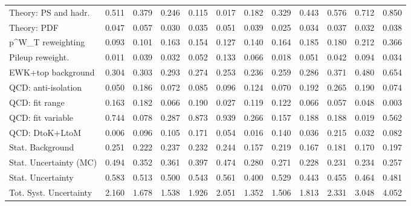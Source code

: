 \begin{tabular}{l|p{0.6cm}p{0.6cm}p{0.6cm}p{0.6cm}p{0.6cm}p{0.6cm}p{0.6cm}p{0.6cm}p{0.6cm}p{0.6cm}p{0.6cm}}
Theory: PS and hadr.                     & 0.511 & 0.379 & 0.246 & 0.115 & 0.017 & 0.182 & 0.329 & 0.443 & 0.576 & 0.712 & 0.850 \\
Theory: PDF                              & 0.047 & 0.057 & 0.030 & 0.035 & 0.051 & 0.039 & 0.025 & 0.034 & 0.037 & 0.032 & 0.038 \\
p^{W}_{T} reweighting                    & 0.093 & 0.101 & 0.163 & 0.154 & 0.127 & 0.140 & 0.164 & 0.185 & 0.180 & 0.212 & 0.366 \\
Pileup reweight.                         & 0.011 & 0.039 & 0.032 & 0.052 & 0.133 & 0.066 & 0.018 & 0.051 & 0.042 & 0.094 & 0.034 \\
EWK+top background                       & 0.304 & 0.303 & 0.293 & 0.274 & 0.253 & 0.236 & 0.259 & 0.286 & 0.371 & 0.480 & 0.654 \\
QCD: anti-isolation                      & 0.050 & 0.186 & 0.072 & 0.085 & 0.096 & 0.124 & 0.070 & 0.192 & 0.265 & 0.190 & 0.074 \\
QCD: fit range                           & 0.163 & 0.182 & 0.066 & 0.190 & 0.027 & 0.119 & 0.122 & 0.066 & 0.057 & 0.048 & 0.003 \\
QCD: fit variable                        & 0.744 & 0.078 & 0.287 & 0.873 & 0.939 & 0.266 & 0.157 & 0.188 & 0.188 & 0.019 & 0.562 \\
QCD: DtoK+LtoM                           & 0.006 & 0.096 & 0.105 & 0.171 & 0.054 & 0.016 & 0.140 & 0.036 & 0.215 & 0.032 & 0.082 \\
Stat. Background                         & 0.251 & 0.222 & 0.237 & 0.232 & 0.244 & 0.157 & 0.219 & 0.167 & 0.181 & 0.170 & 0.197 \\
Stat. Uncertainty (MC)                   & 0.494 & 0.352 & 0.361 & 0.397 & 0.474 & 0.280 & 0.271 & 0.228 & 0.231 & 0.234 & 0.257 \\
\hline
Stat. Uncertainty                        & 0.583 & 0.513 & 0.500 & 0.543 & 0.561 & 0.400 & 0.529 & 0.443 & 0.455 & 0.464 & 0.481 \\
\hline
Tot. Syst. Uncertainty                   & 2.160 & 1.678 & 1.538 & 1.926 & 2.051 & 1.352 & 1.506 & 1.813 & 2.331 & 3.048 & 4.052 \\
\hline
\end{tabular}
